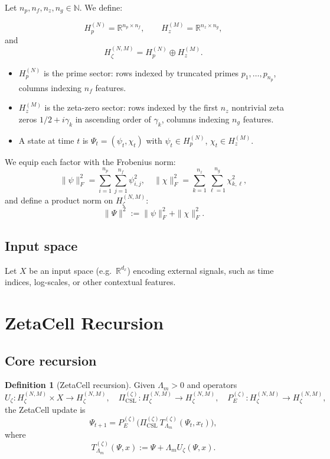 \documentclass[11pt]{article}
\theoremstyle{definition}
\newtheorem{definition}{Definition}
\theoremstyle{plain}
\begin{document}
Let $n_p,n_f,n_z,n_g \in \mathbb{N}$.
We define:

\[
  H_p^{(N)} = \mathbb{R}^{n_p \times n_f},
  \qquad
  H_z^{(M)} = \mathbb{R}^{n_z \times n_g},
\]
and
\[
  H_\zeta^{(N,M)} = H_p^{(N)} \oplus H_z^{(M)}.
\]

\begin{itemize}[leftmargin=*]
  \item $H_p^{(N)}$ is the prime sector: rows indexed by truncated primes $p_1,\dots,p_{n_p}$, columns indexing $n_f$ features.

  \item $H_z^{(M)}$ is the zeta-zero sector: rows indexed by the first $n_z$ nontrivial zeta zeros $1/2 + i\gamma_k$ in ascending order of $\gamma_k$, columns indexing $n_g$ features.

  \item A state at time $t$ is $\Psi_t = (\psi_t,\chi_t)$ with $\psi_t \in H_p^{(N)}$, $\chi_t \in H_z^{(M)}$.
\end{itemize}

We equip each factor with the Frobenius norm:
\[
  \|\psi\|_F^2 = \sum_{i=1}^{n_p}\sum_{j=1}^{n_f} \psi_{i,j}^2,
  \quad
  \|\chi\|_F^2 = \sum_{k=1}^{n_z}\sum_{\ell=1}^{n_g} \chi_{k,\ell}^2,
\]
and define a product norm on $H_\zeta^{(N,M)}$:
\[
  \|\Psi\|^2 := \|\psi\|_F^2 + \|\chi\|_F^2.
\]

\subsection{Input space}

Let $X$ be an input space (e.g.\ $\mathbb{R}^{d_x}$) encoding external signals, such as time indices, log-scales, or other contextual features.

\section{ZetaCell Recursion}

\subsection{Core recursion}

\begin{definition}[ZetaCell recursion]
Given $\Lambda_m > 0$ and operators
\[
  U_\zeta : H_\zeta^{(N,M)} \times X \to H_\zeta^{(N,M)},
  \quad
  \Pi_{\mathrm{CSL}}^{(\zeta)} : H_\zeta^{(N,M)} \to H_\zeta^{(N,M)},
  \quad
  P_E^{(\zeta)} : H_\zeta^{(N,M)} \to H_\zeta^{(N,M)},
\]
the ZetaCell update is
\[
  \Psi_{t+1}
  =
  P_E^{(\zeta)}\!\bigl(\Pi_{\mathrm{CSL}}^{(\zeta)} T_{\Lambda_m}^{(\zeta)}(\Psi_t,x_t)\bigr),
\]
where
\[
  T_{\Lambda_m}^{(\zeta)}(\Psi,x) := \Psi + \Lambda_m U_\zeta(\Psi,x).
\]
\end{definition}
\end{document}
